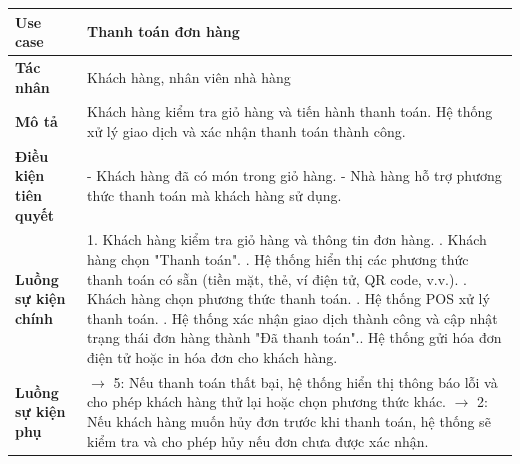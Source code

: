 \documentclass[a4paper]{article}
\begin{document}
\begin{table}[H]
    \small
    \centering
    \renewcommand{\arraystretch}{1.5} %
    \setlength{\arrayrulewidth}{0.5mm} %
    \setlength{\tabcolsep}{5pt} %
    \begin{tabularx}{\textwidth}{|l|X|}
        \hline
        \textbf{Use case}             & Thanh toán đơn hàng                                                                                               \\
        \hline
        \textbf{Tác nhân}             & Khách hàng, nhân viên nhà hàng                                                                                    \\
        \hline
        \textbf{Mô tả}                & Khách hàng kiểm tra giỏ hàng và tiến hành thanh toán. Hệ thống xử lý giao dịch và xác nhận thanh toán thành công. \\
        \hline
        \textbf{Điều kiện tiên quyết} &
        - Khách hàng đã có món trong giỏ hàng. \newline
        - Nhà hàng hỗ trợ phương thức thanh toán mà khách hàng sử dụng.                                                                                   \\
        \hline
        \textbf{Luồng sự kiện chính}  &
        1. Khách hàng kiểm tra giỏ hàng và thông tin đơn hàng. \newline
        2. Khách hàng chọn "Thanh toán". \newline
        3. Hệ thống hiển thị các phương thức thanh toán có sẵn (tiền mặt, thẻ, ví điện tử, QR code, v.v.). \newline
        4. Khách hàng chọn phương thức thanh toán.  \newline
        5. Hệ thống POS xử lý thanh toán. \newline
        6. Hệ thống xác nhận giao dịch thành công và cập nhật trạng thái đơn hàng thành "Đã thanh toán".\newline
        7. Hệ thống gửi hóa đơn điện tử hoặc in hóa đơn cho khách hàng.                                                                                   \\
        \hline
        \textbf{Luồng sự kiện phụ}    &
        $\rightarrow$ 5:  Nếu thanh toán thất bại, hệ thống hiển thị thông báo lỗi và cho phép khách hàng thử lại hoặc chọn phương thức khác. \newline
        $\rightarrow$ 2: Nếu khách hàng muốn hủy đơn trước khi thanh toán, hệ thống sẽ kiểm tra và cho phép hủy nếu đơn chưa được xác nhận. \newline

\end{tabularx}
\end{table}
\end{document}
